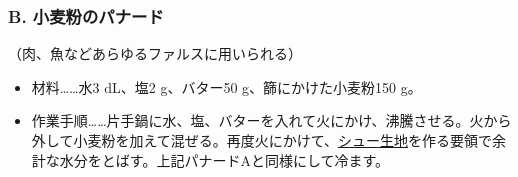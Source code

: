\begin{recette}
\vspace*{1\zw}

\hypertarget{panade-b}{%
\subsubsection{B. 小麦粉のパナード}\label{panade-b}}



（肉、魚などあらゆるファルスに用いられる）

\begin{itemize}
\item
  材料\ldots{}\ldots{}水3 dL、塩2 g、バター50 g、篩にかけた小麦粉150 g。
\item
  作業手順\ldots{}\ldots{}片手鍋に水、塩、バターを入れて火にかけ、沸騰させる。火から外して小麦粉を加えて混ぜる。再度火にかけて、\protect\hyperlink{pate-a-chou}{シュー生地}を作る要領で余計な水分をとばす。上記パナードAと同様にして冷ます。
\end{itemize}

\atoaki{}

\hypertarget{panade-c}{%
}
\end{recette}
